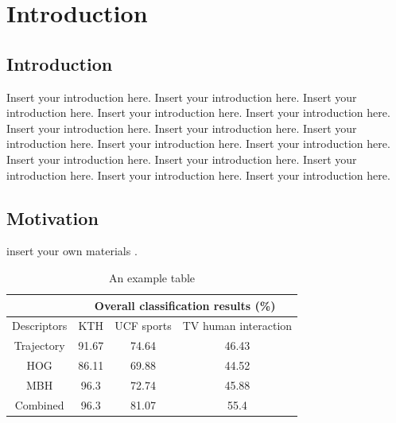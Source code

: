 

\chapter{Introduction}\label{chapter1}
\section{Introduction} \label{chap1:sec1}

Insert your introduction here. Insert your introduction here. Insert your introduction here. Insert your introduction here. Insert your introduction here. Insert your introduction here. Insert your introduction here. Insert your introduction here. Insert your introduction here. Insert your introduction here. Insert your introduction here. Insert your introduction here. Insert your introduction here. Insert your introduction here. Insert your introduction here.  


\section{Motivation} \label{chap1:sec2}

insert your own materials \cite{ref1}.


\begin{table}[htbp]
  \centering
    \begin{tabular}{|c|c|c|c|}
    \hline
        & \multicolumn{3}{|c|}{Overall classification results (\%)} \\
    \hline
       Descriptors          & KTH   & UCF sports & TV human interaction \\
    \hline
    Trajectory & 91.67 & 74.64 & 46.43 \\
    HOG   & 86.11 & 69.88 & 44.52 \\
    MBH   & 96.3 & 72.74 & 45.88 \\
    \hline
     \hline
    Combined & 96.3 & 81.07 & 55.4 \\
    \hline
    \end{tabular}%
    \caption{An example table}
  \label{t1}%
\end{table}%


